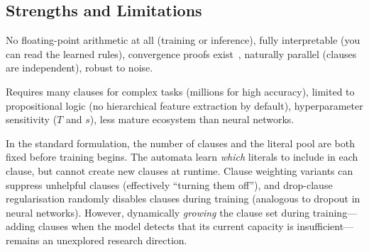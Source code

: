 \subsection{Strengths and Limitations}

\begin{description}[leftmargin=1em]
  \item[Strengths:]
    No floating-point arithmetic at all (training or inference),
    fully interpretable (you can read the learned rules),
    convergence proofs exist~\cite{granmo2018tsetlin},
    naturally parallel (clauses are independent),
    robust to noise.

  \item[Limitations:]
    Requires many clauses for complex tasks (millions for high
    accuracy), limited to propositional logic (no hierarchical
    feature extraction by default), hyperparameter sensitivity
    ($T$ and $s$), less mature ecosystem than neural networks.

  \item[Open question:]
    In the standard formulation, the number of clauses and the literal
    pool are both fixed before training begins. The automata learn
    \emph{which} literals to include in each clause, but cannot create
    new clauses at runtime. Clause weighting variants can suppress
    unhelpful clauses (effectively ``turning them off''), and drop-clause
    regularisation randomly disables clauses during training (analogous
    to dropout in neural networks). However, dynamically \emph{growing}
    the clause set during training---adding clauses when the model
    detects that its current capacity is insufficient---remains an
    unexplored research direction.
\end{description}
